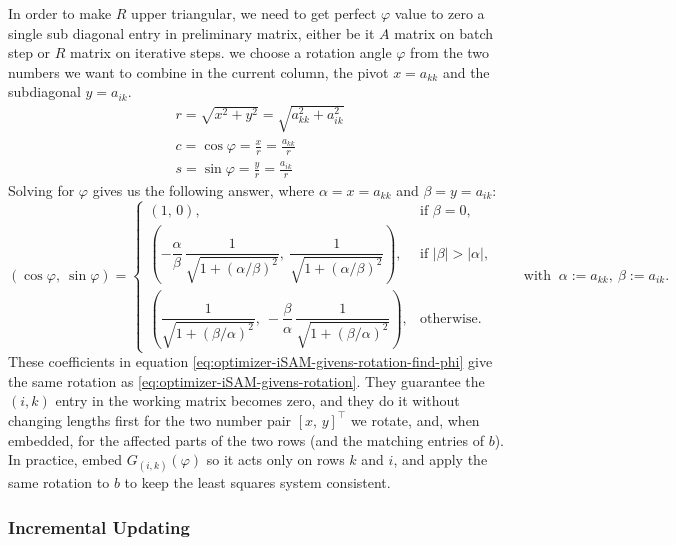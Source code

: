 
\noindent
In order to make $R$ upper triangular, we need to get perfect $\varphi$ value to zero a single sub diagonal entry in preliminary matrix, either be it $A$ matrix on batch step or $R$ matrix on iterative steps. we choose a rotation angle $\varphi$ from the two numbers we want to combine in the current column, the pivot $x=a_{kk}$ and the subdiagonal $y=a_{ik}$.
$$
    \begin{aligned}
        r=\sqrt{x^2+y^2}=\sqrt{a_{kk}^2+a_{ik}^2} \\
        c=\cos\varphi=\frac{x}{r}=\frac{a_{kk}}{r} \\
        s=\sin\varphi=\frac{y}{r}=\frac{a_{ik}}{r} 
    \end{aligned}
$$
Solving for $\varphi$ gives us the following answer, where $\alpha = x = a_{kk}$ and $\beta = y = a_{ik}$:
\begin{equation}
    (\cos\varphi,\ \sin\varphi)=
    \begin{cases}
    (1,\,0), & \text{if }\beta=0,\\[6pt]
    \left(-\dfrac{\alpha}{\beta}\,\dfrac{1}{\sqrt{1+(\alpha/\beta)^2}},\ \dfrac{1}{\sqrt{1+(\alpha/\beta)^2}}\right), & \text{if }|\beta|>|\alpha|,\\[10pt]
    \left(\dfrac{1}{\sqrt{1+(\beta/\alpha)^2}},\ -\dfrac{\beta}{\alpha}\,\dfrac{1}{\sqrt{1+(\beta/\alpha)^2}}\right), & \text{otherwise.}
    \end{cases}
    \qquad\text{with }\ \alpha:=a_{kk},\ \beta:=a_{ik}.
    \label{eq:optimizer-iSAM-givens-rotation-find-phi}
\end{equation}
These coefficients in equation \eqref{eq:optimizer-iSAM-givens-rotation-find-phi} give the same rotation as \eqref{eq:optimizer-iSAM-givens-rotation}. They guarantee the $(i,k)$ entry in the working matrix becomes zero, and they do it without changing lengths first for the two number pair $[x,\,y]^\top$ we rotate, and, when embedded, for the affected parts of the two rows (and the matching entries of $b$). In practice, embed $G_{(i,k)}(\varphi)$ so it acts only on rows $k$ and $i$, and apply the same rotation to $b$ to keep the least squares system consistent.



\subsubsection{Incremental Updating}

